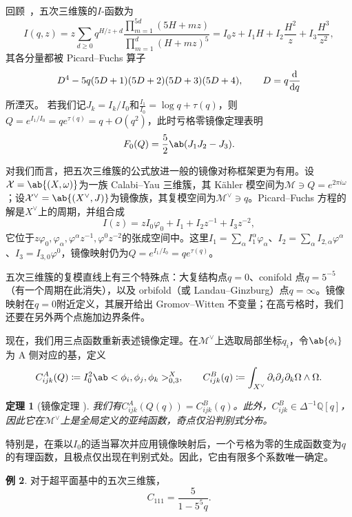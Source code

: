\documentclass{amsart}
\newtheorem{thm}{定理}[section]
\theoremstyle{definition}
\newtheorem{exm}[thm]{例}
\theoremstyle{remark}
\theoremstyle{plain}
\theoremstyle{definition}
\theoremstyle{remark}
\newcommand{\Q}{\mathbb{Q}}
\newcommand{\mc}[1]{\mathcal{#1}}
\newcommand{\1}{\mathbf{1}}
\newcommand{\2}{\mathbf{2}}
\newcommand{\3}{\mathbf{3}}
\begin{document}
回顾~，五次三维簇的\(I\)-函数为
\[
    I(q,z) = z\sum_{d \geq 0} q^{H/z+d} \frac{\prod_{m=1}^{5d}(5H+mz)}{\prod_{m=1}^d (H+mz)^5} = I_0 z + I_1 H + I_2 \frac{H^2}{z} + I_3 \frac{H^3}{z^2},
\]
其各分量都被 Picard--Fuchs 算子
\[ D^4 - 5q(5D+1)(5D+2)(5D+3)(5D+4), \qquad D = q \odv{}{q} \]
所湮灭。
若我们记\(J_k = I_k/I_0\)和\(\frac{I_1}{I_0} = \log q + \tau(q)\)，则\(Q = e^{I_1/I_0} = qe^{\tau(q)} = q + O(q^2)\)，此时亏格零镜像定理表明
\[ F_0(Q) = \frac{5}{2}\ab(J_1 J_2 - J_3). \]

对我们而言，把五次三维簇的公式放进一般的镜像对称框架更为有用。设\(\mc{X} = \ab\{(X,\omega)\}\)为一族 Calabi--Yau 三维簇，其 Kähler 模空间为\(\mc{M} \ni Q = e^{2\pi i \omega}\)；设\(\mc{X}^{\vee} = \ab\{(X^{\vee},J)\}\)为镜像族，其复模空间为\(\mc{M}^{\vee} \ni q\)。Picard--Fuchs 方程的解是\(X^{\vee}\)上的周期，并组合成
\[ I(z) = zI_0\varphi_0 + I_1 + I_2 z^{-1} + I_3 z^{-2}, \]
它位于\(z\varphi_0, \varphi_{\alpha}, \varphi^{\alpha}z^{-1}, \varphi^0 z^{-2}\)的张成空间中。这里\(I_1 = \sum_{\alpha} I_1^{\alpha}\varphi_{\alpha}\)、\(I_2 = \sum_{\alpha} I_{2,\alpha}\varphi^{\alpha}\)、\(I_3 = I_{3,0}\varphi^0\)，镜像映射仍为\(Q = e^{I_1/I_0} = qe^{\tau(q)}\)。

五次三维簇的复模直线上有三个特殊点：大复结构点\(q=0\)、conifold 点\(q = 5^{-5}\)（有一个周期在此消失），以及 orbifold（或 Landau--Ginzburg）点\(q = \infty\)。镜像映射在\(q=0\)附近定义，其展开给出 Gromov--Witten 不变量；在高亏格时，我们还要在另外两个点施加边界条件。

现在，我们用三点函数重新表述镜像定理。在\(\mc{M}^{\vee}\)上选取局部坐标\(q_i\)，令\(\ab\{\phi_i\}\)为 A 侧对应的基，定义
\[ C^A_{ijk}(Q) \coloneqq I_0^2 \ab<\phi_i, \phi_j, \phi_k>^X_{0,3}, \qquad C^B_{ijk}(q) \coloneqq \int_{X^{\vee}} \partial_i \partial_j \partial_k \Omega \wedge \Omega. \]

\begin{thm}[镜像定理 {\cite{Givental1998,LLY1997}}]
我们有\(C^A_{ijk}(Q(q)) = C^B_{ijk}(q)\)。此外，\(C^B_{ijk} \in \Delta^{-1}\Q[q]\)，因此它在\(\mc{M}^{\vee}\)上是全局定义的亚纯函数，奇点仅沿判别式分布。
\end{thm}

特别是，在乘以\(I_0\)的适当幂次并应用镜像映射后，一个亏格为零的生成函数变为\(q\)的有理函数，且极点仅出现在判别式处。因此，它由有限多个系数唯一确定。

\begin{exm}
对于超平面基中的五次三维簇，
    \[ C_{111} = \frac{5}{1-5^5 q}. \]
\end{exm}
\end{document}
